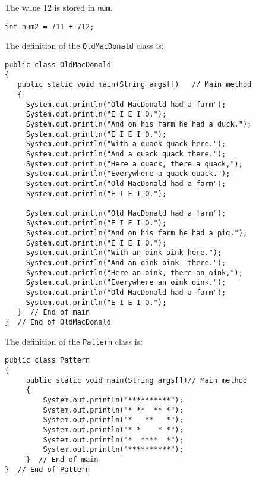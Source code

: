 \pagebreak
\secANSH%
\begin{ANS}
\item The value 12 is stored in {\tt num}.

\item {\tt int num2 = 711 + 712;}

\item The definition of the {\tt OldMacDonald} class is:

\begin{jjjlisting}
\begin{lstlisting}
public class OldMacDonald
{
   public static void main(String args[])   // Main method
   {
     System.out.println("Old MacDonald had a farm");
     System.out.println("E I E I O.");
     System.out.println("And on his farm he had a duck.");
     System.out.println("E I E I O.");
     System.out.println("With a quack quack here.");
     System.out.println("And a quack quack there.");
     System.out.println("Here a quack, there a quack,");
     System.out.println("Everywhere a quack quack.");
     System.out.println("Old MacDonald had a farm");
     System.out.println("E I E I O.");

     System.out.println("Old MacDonald had a farm");
     System.out.println("E I E I O.");
     System.out.println("And on his farm he had a pig.");
     System.out.println("E I E I O.");
     System.out.println("With an oink oink here.");
     System.out.println("And an oink oink  there.");
     System.out.println("Here an oink, there an oink,");
     System.out.println("Everywhere an oink oink.");
     System.out.println("Old MacDonald had a farm");
     System.out.println("E I E I O.");
   }  // End of main
}  // End of OldMacDonald
\end{lstlisting}
\end{jjjlisting}

\item The definition of the {\tt Pattern} class is:

\begin{jjjlisting}
\begin{lstlisting}
public class Pattern
{
     public static void main(String args[])// Main method
     {
         System.out.println("**********");
         System.out.println("* **  ** *");
         System.out.println("*   **   *");
         System.out.println("* *    * *");
         System.out.println("*  ****  *");
         System.out.println("**********");
     }  // End of main
}  // End of Pattern
\end{lstlisting}
\end{jjjlisting}

\end{ANS}

